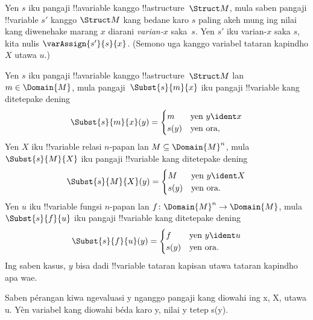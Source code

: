 \documentclass[../../../include/open-logic-section]{subfiles}
\begin{document}
\begin{defn}[Varian-$x$]
Yen $s$ iku pangaji !!a{variable} kanggo !!a{structure}~$\Struct M$,
mula saben pangaji !!{variable} $s'$ kanggo $\Struct M$ kang
bedane karo $s$ paling akeh mung ing nilai kang diwenehake marang
$x$ diarani \emph{varian-$x$} saka~$s$. Yen $s'$ iku varian-$x$
saka $s$, kita nulis $\varAssign{s'}{s}{x}$. (Semono uga kanggo
variabel tataran kapindho $X$ utawa $u$.)
\end{defn}

\begin{defn}
  Yen $s$ iku pangaji !!a{variable} kanggo
  !!a{structure}~$\Struct M$ lan $m \in \Domain{M}$, mula
  pangaji~$\Subst{s}{m}{x}$ iku pangaji !!{variable} kang
  ditetepake dening
  \[\Subst{s}{m}{x}(y) = \begin{cases}
    m & \text{yen } y \ident x\\
    s(y) & \text{yen ora},
  \end{cases}\]
  Yen $X$ iku !!{variable} relasi $n$-papan lan $M \subseteq
  \Domain{M}^n$, mula $\Subst{s}{M}{X}$ iku pangaji
  !!{variable} kang ditetepake dening
  \[\Subst{s}{M}{X}(y) = \begin{cases}
    M & \text{yen } y \ident X\\
    s(y) & \text{yen ora}.
  \end{cases}\]
  Yen $u$ iku !!{variable} fungsi $n$-papan lan
  $f\colon \Domain{M}^n \to \Domain{M}$, mula
  $\Subst{s}{f}{u}$ iku pangaji !!{variable} kang ditetepake
  dening
  \[\Subst{s}{f}{u}(y) = \begin{cases}
    f & \text{yen } y \ident u\\
    s(y) & \text{yen ora}.
  \end{cases}\]
  Ing saben kasus, $y$ bisa dadi !!{variable} tataran kapisan utawa
  tataran kapindho apa wae.
\end{defn}
Saben pérangan kiwa ngevaluasi y nganggo pangaji kang diowahi ing x, X, utawa u. Yèn variabel kang diowahi béda karo y, nilai y tetep s(y).
\end{document}
